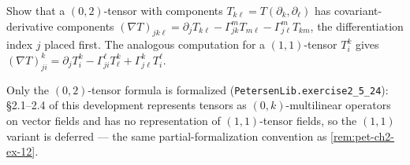 \begin{remark}
  \label{rem:pet-ch2-ex-24}
  \leanok
  Show that a $(0,2)$-tensor with components $T_{k\ell}=T(\partial_k,\partial_\ell)$
  has covariant-derivative components
  $(\nabla T)_{jk\ell}=\partial_jT_{k\ell}-\Gamma^m_{jk}T_{m\ell}-\Gamma^m_{j\ell}T_{km}$,
  the differentiation index $j$ placed first. The analogous computation for a
  $(1,1)$-tensor $T^k_i$ gives
  $(\nabla T)^k_{ji}=\partial_jT^k_i-\Gamma^\ell_{ji}T^k_\ell+\Gamma^k_{j\ell}T^\ell_i$.

  Only the $(0,2)$-tensor formula is formalized
  (\texttt{PetersenLib.exercise2\_5\_24}): §2.1–2.4 of this development represents
  tensors as $(0,k)$-multilinear operators on vector fields and has no
  representation of $(1,1)$-tensor fields, so the $(1,1)$ variant is deferred —
  the same partial-formalization convention as \cref{rem:pet-ch2-ex-12}.
\end{remark}

